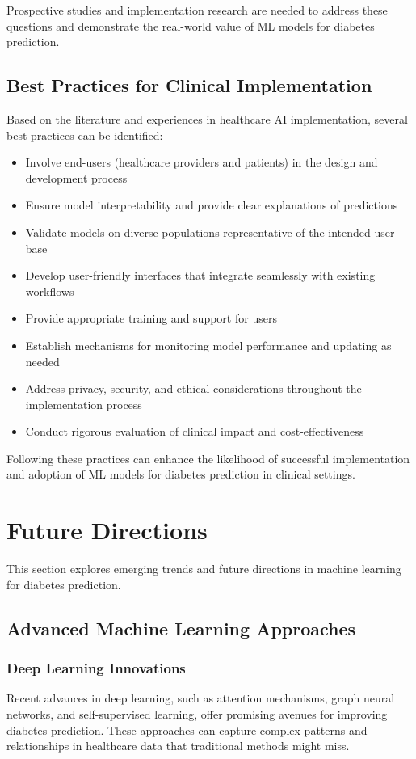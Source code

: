 \documentclass[journal]{IEEEtran}
\begin{document}
Prospective studies and implementation research are needed to address these questions and demonstrate the real-world value of ML models for diabetes prediction.

\subsection{Best Practices for Clinical Implementation}
Based on the literature and experiences in healthcare AI implementation, several best practices can be identified:

\begin{itemize}
    \item Involve end-users (healthcare providers and patients) in the design and development process
    \item Ensure model interpretability and provide clear explanations of predictions
    \item Validate models on diverse populations representative of the intended user base
    \item Develop user-friendly interfaces that integrate seamlessly with existing workflows
    \item Provide appropriate training and support for users
    \item Establish mechanisms for monitoring model performance and updating as needed
    \item Address privacy, security, and ethical considerations throughout the implementation process
    \item Conduct rigorous evaluation of clinical impact and cost-effectiveness
\end{itemize}

Following these practices can enhance the likelihood of successful implementation and adoption of ML models for diabetes prediction in clinical settings.

\section{Future Directions}
This section explores emerging trends and future directions in machine learning for diabetes prediction.

\subsection{Advanced Machine Learning Approaches}
\subsubsection{Deep Learning Innovations}
Recent advances in deep learning, such as attention mechanisms, graph neural networks, and self-supervised learning, offer promising avenues for improving diabetes prediction. These approaches can capture complex patterns and relationships in healthcare data that traditional methods might miss.
\end{document}
